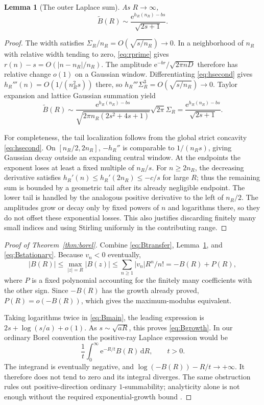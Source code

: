 \documentclass[11pt,a4paper]{article}
\numberwithin{equation}{section}
\newtheorem{lemma}[theorem]{Lemma}
\theoremstyle{definition}
\theoremstyle{remark}\newtheorem{remark}[theorem]{Remark}
\newcommand{\ee}{\mathrm e}\newcommand{\dd}{\mathrm d}
\begin{document}
\begin{lemma}[The outer Laplace sum]
\label{lem:Bsum}
As $R\to\infty$,
\begin{equation}
 \widetilde B(R)\sim
 \frac{\ee^{h_R(n_R)-bs}}{\sqrt{2s+1}}.
 \label{eq:Bsum}
\end{equation}
\end{lemma}
\begin{proof}
The width satisfies $\Sigma_R/n_R=O(\sqrt{s/n_R})\to0$.
In a neighborhood of $n_R$ with relative width tending to zero,
\eqref{eq:rprime} gives $r(n)-s=O(|n-n_R|/n_R)$.
The amplitude $\ee^{-br}/\sqrt{2\pi nD}$ therefore has relative change
$o(1)$ on a Gaussian window.
Differentiating \eqref{eq:hsecond} gives
$h_R'''(n)=O(1/(n_R^2s))$ there, so
$h_R'''\Sigma_R^3=O(\sqrt{s/n_R})\to0$.
Taylor expansion and lattice Gaussian summation yield
\[
 \widetilde B(R)\sim
 \frac{\ee^{h_R(n_R)-bs}}{\sqrt{2\pi n_R(2s^2+4s+1)}}
 \sqrt{2\pi}\Sigma_R
 =\frac{\ee^{h_R(n_R)-bs}}{\sqrt{2s+1}}.
\]

For completeness, the tail localization follows from the global strict
concavity \eqref{eq:hsecond}. On $[n_R/2,2n_R]$,
$-h_R''$ is comparable to $1/(n_Rs)$, giving Gaussian decay outside an
expanding central window. At the endpoints the exponent loses at least
a fixed multiple of $n_R/s$. For $n\ge2n_R$, the decreasing derivative
satisfies $h_R'(n)\le h_R'(2n_R)\le-c/s$ for large $R$; thus the remaining
sum is bounded by a geometric tail after its already negligible endpoint.
The lower tail is handled by the analogous positive derivative to the
left of $n_R/2$. The amplitudes grow or decay only by fixed powers of $n$
and logarithms there, so they do not offset these exponential losses.
This also justifies discarding finitely many small indices and using
Stirling uniformly in the contributing range.
\end{proof}

\begin{proof}[Proof of Theorem~\ref{thm:borel}]
Combine \eqref{eq:Btransfer}, Lemma~\ref{lem:Bsum}, and
\eqref{eq:Bstationary}. Because $v_n<0$ eventually,
\[
 |B(R)|\le\max_{|z|=R}|B(z)|
 \le\sum_{n\ge1}|v_n|R^n/n!=-B(R)+P(R),
\]
where $P$ is a fixed polynomial accounting for the finitely many coefficients
with the other sign. Since $-B(R)$ has the growth already proved,
$P(R)=o(-B(R))$, which gives the maximum-modulus equivalent.

Taking logarithms twice in \eqref{eq:Bmain}, the leading expression is
$2s+\log(s/a)+o(1)$. As $s\sim\sqrt{aR}$, this proves
\eqref{eq:Bgrowth}. In our ordinary Borel convention the positive-ray
Laplace expression would be
\[
 \frac1t\int_0^\infty\ee^{-R/t}B(R)\,\dd R,\qquad t>0.
\]
The integrand is eventually negative, and
$\log(-B(R))-R/t\to+\infty$. It therefore does not tend to zero and its
integral diverges. The same obstruction rules out positive-direction
ordinary $1$-summability; analyticity alone is not enough without the
required exponential-growth bound \cite{sauzin}.
\end{proof}
\end{document}
